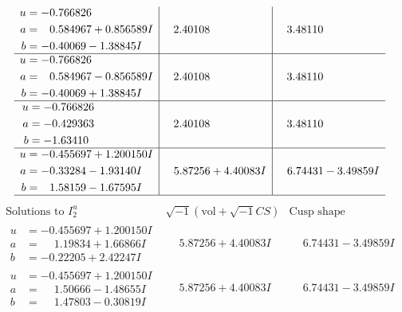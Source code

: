 \documentclass[1p]{elsarticle_modified}
\theoremstyle{definition}
\newcommand{\I}{\sqrt{-1}}
\begin{document}
$$\begin{array}{c|c|c}
\begin{aligned}
u &= -0.766826\phantom{ +0.000000I} \\
a &= \phantom{-}0.584967 + 0.856589 I \\
b &= -0.40069 - 1.38845 I\end{aligned}
 & \phantom{-}2.40108\phantom{ +0.000000I} & \phantom{-}3.48110\phantom{ +0.000000I} \\ \hline\begin{aligned}
u &= -0.766826\phantom{ +0.000000I} \\
a &= \phantom{-}0.584967 - 0.856589 I \\
b &= -0.40069 + 1.38845 I\end{aligned}
 & \phantom{-}2.40108\phantom{ +0.000000I} & \phantom{-}3.48110\phantom{ +0.000000I} \\ \hline\begin{aligned}
u &= -0.766826\phantom{ +0.000000I} \\
a &= -0.429363\phantom{ +0.000000I} \\
b &= -1.63410\phantom{ +0.000000I}\end{aligned}
 & \phantom{-}2.40108\phantom{ +0.000000I} & \phantom{-}3.48110\phantom{ +0.000000I} \\ \hline\begin{aligned}
u &= -0.455697 + 1.200150 I \\
a &= -0.33284 - 1.93140 I \\
b &= \phantom{-}1.58159 - 1.67595 I\end{aligned}
 & \phantom{-}5.87256 + 4.40083 I & \phantom{-}6.74431 - 3.49859 I\\
 \hline 
 \end{array}$$\newpage$$\begin{array}{c|c|c}  
\text{Solutions to }I^u_{2}& \I (\text{vol} + \sqrt{-1}CS) & \text{Cusp shape}\\
 \hline 
\begin{aligned}
u &= -0.455697 + 1.200150 I \\
a &= \phantom{-}1.19834 + 1.66866 I \\
b &= -0.22205 + 2.42247 I\end{aligned}
 & \phantom{-}5.87256 + 4.40083 I & \phantom{-}6.74431 - 3.49859 I \\ \hline\begin{aligned}
u &= -0.455697 + 1.200150 I \\
a &= \phantom{-}1.50666 - 1.48655 I \\
b &= \phantom{-}1.47803 - 0.30819 I\end{aligned}
 & \phantom{-}5.87256 + 4.40083 I & \phantom{-}6.74431 - 3.49859 I \\ \hline\begin{aligned}

\end{aligned}
\end{array}$$
\end{document}
